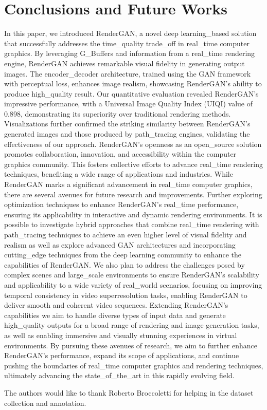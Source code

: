\section{Conclusions and Future Works}
\label{sec:conclusion}
In this paper, we introduced RenderGAN, a novel deep learning_based solution that successfully addresses the time_quality trade_off in real_time computer graphics. By leveraging G_Buffers and information from a real_time rendering engine, RenderGAN achieves remarkable visual fidelity in generating output images. The encoder_decoder architecture, trained using the GAN framework with perceptual loss, enhances image realism, showcasing RenderGAN's ability to produce high_quality result. Our quantitative evaluation revealed RenderGAN's impressive performance, with a Universal Image Quality Index (UIQI) value of 0.898, demonstrating its superiority over traditional rendering methods. Visualizations further confirmed the striking similarity between RenderGAN's generated images and those produced by path_tracing engines, validating the effectiveness of our approach. RenderGAN's openness as an open_source solution promotes collaboration, innovation, and accessibility within the computer graphics community. This fosters collective efforts to advance real_time rendering techniques, benefiting a wide range of applications and industries. While RenderGAN marks a significant advancement in real_time computer graphics, there are several avenues for future research and improvements. Further exploring optimization techniques to enhance RenderGAN's real_time performance, ensuring its applicability in interactive and dynamic rendering environments. It is possible to investigate hybrid approaches that combine real_time rendering with path_tracing techniques to achieve an even higher level of visual fidelity and realism as well as explore advanced GAN architectures and incorporating cutting_edge techniques from the deep learning community to enhance the capabilities of RenderGAN. We also plan to address the challenges posed by complex scenes and large_scale environments to ensure RenderGAN's scalability and applicability to a wide variety of real_world scenarios, focusing on improving temporal consistency in video superresolution tasks, enabling RenderGAN to deliver smooth and coherent video sequences. Extending RenderGAN's capabilities we aim to handle diverse types of input data and generate high_quality outputs for a broad range of rendering and image generation tasks, as well as enabling immersive and visually stunning experiences in virtual environments.
By pursuing these avenues of research, we aim to further enhance RenderGAN's performance, expand its scope of applications, and continue pushing the boundaries of real_time computer graphics and rendering techniques, ultimately advancing the state_of_the_art in this rapidly evolving field.

\begin{acks}
The authors would like to thank Roberto Broccoletti for helping in the dataset collection and annotation. 

\end{acks}


